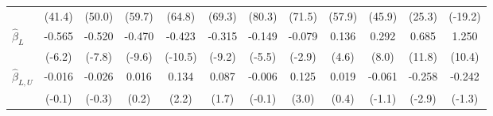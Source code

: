 \begin{tabular}{lccccccccccc}
 & (41.4) & (50.0) & (59.7) & (64.8) & (69.3) & (80.3) & (71.5) & (57.9) & (45.9) & (25.3) & (-19.2) \\
$\hat\beta_L$ & -0.565 & -0.520 & -0.470 & -0.423 & -0.315 & -0.149 & -0.079 & 0.136 & 0.292 & 0.685 & 1.250 \\
 & (-6.2) & (-7.8) & (-9.6) & (-10.5) & (-9.2) & (-5.5) & (-2.9) & (4.6) & (8.0) & (11.8) & (10.4) \\
$\hat\beta_{L,U}$ & -0.016 & -0.026 & 0.016 & 0.134 & 0.087 & -0.006 & 0.125 & 0.019 & -0.061 & -0.258 & -0.242 \\
 & (-0.1) & (-0.3) & (0.2) & (2.2) & (1.7) & (-0.1) & (3.0) & (0.4) & (-1.1) & (-2.9) & (-1.3) \\
\bottomrule
\end{tabular}
